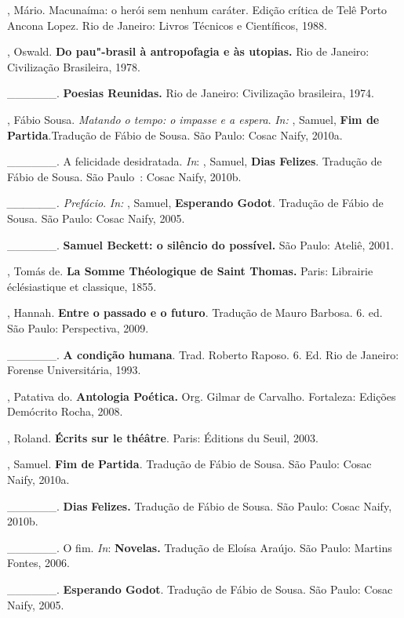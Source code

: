 \begin{Parskip}
, Mário. Macunaíma: o herói sem nenhum caráter. Edição crítica de
Telê Porto Ancona Lopez. Rio de Janeiro: Livros Técnicos e Científicos,
1988.

, Oswald. \textbf{Do pau"-brasil à antropofagia e às utopias.} Rio
de Janeiro: Civilização Brasileira, 1978.

\_\_\_\_\_\_. \textbf{Poesias Reunidas.} Rio de Janeiro: Civilização
brasileira, 1974.

, Fábio Sousa. \emph{Matando o tempo: o impasse e a espera}.
\emph{In:} , Samuel, \textbf{Fim de Partida}.Tradução de Fábio de
Sousa. São Paulo: Cosac Naify, 2010a.

\_\_\_\_\_\_. A felicidade desidratada. \emph{In}: , Samuel,
\textbf{Dias Felizes}. Tradução de Fábio de Sousa. São Paulo~: Cosac
Naify, 2010b.

\emph{\_\_\_\_\_\_. Prefácio}. \emph{In:} , Samuel,
\textbf{Esperando Godot}. Tradução de Fábio de Sousa. São Paulo: Cosac
Naify, 2005.

\_\_\_\_\_\_. \textbf{Samuel Beckett: o silêncio do possível.} São
Paulo: Ateliê, 2001.

, Tomás de. \textbf{La Somme Théologique de Saint Thomas.} Paris:
Librairie éclésiastique et classique, 1855.

, Hannah. \textbf{Entre o passado e o futuro}. Tradução de Mauro
Barbosa. 6. ed. São Paulo: Perspectiva, 2009.

\_\_\_\_\_\_. \textbf{A condição humana}. Trad. Roberto Raposo. 6. Ed.
Rio de Janeiro: Forense Universitária, 1993.

, Patativa do. \textbf{Antologia Poética.} Org. Gilmar de
Carvalho. Fortaleza: Edições Demócrito Rocha, 2008.

, Roland. \textbf{Écrits sur le théâtre}. Paris: Éditions du
Seuil, 2003.

, Samuel. \textbf{Fim de Partida}. Tradução de Fábio de Sousa.
São Paulo: Cosac Naify, 2010a.

\_\_\_\_\_\_. \textbf{Dias} \textbf{Felizes.} Tradução de Fábio de
Sousa. São Paulo: Cosac Naify, 2010b.

\_\_\_\_\_\_. O fim. \emph{In}: \textbf{Novelas.} Tradução de Eloísa
Araújo. São Paulo: Martins Fontes, 2006.

\_\_\_\_\_\_. \textbf{Esperando Godot}. Tradução de Fábio de Sousa. São
Paulo: Cosac Naify, 2005.


\end{Parskip}
